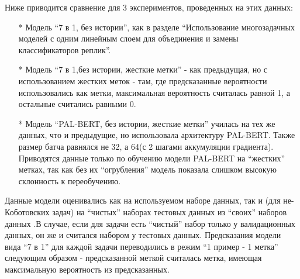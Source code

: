 Ниже приводится сравнение для 3 экспериментов, проведенных на этих данных:
\begin{itemize}
\item[*] Модель “7 в 1, без истории”, как в разделе “Использование многозадачных моделей с одним линейным слоем для объединения и замены классификаторов реплик”. 
\item[*] Модель “7 в 1,без истории, жесткие метки” - как предыдущая, но с использованием жестких меток - там, где предсказанные вероятности использовались как метки, максимальная вероятность считалась равной 1, а остальные считались равными 0. 
\item[*] Модель “PAL-BERT, без истории, жесткие метки” училась на тех же данных, что и предыдущие, но использовала архитектуру PAL-BERT. Также размер батча равнялся не 32, а 64(с 2 шагами аккумуляции градиента). Приводятся данные только по обучению модели PAL-BERT на “жестких” метках, так как без их “огрубления” модель показала слишком высокую склонность к переобучению.
\end{itemize}
Данные модели оценивались как на используемом наборе данных, так и  (для не-Коботовских задач) на “чистых” наборах тестовых данных из “своих” наборов данных .В случае, если для задачи есть “чистый” набор только у валидационных данных, он же и считался набором у тестовых данных.
Предсказания модели вида “7 в 1” для каждой задачи переводились в режим “1 пример - 1 метка” следующим образом - предсказанной меткой считалась метка, имеющая максимальную вероятность из предсказанных.

